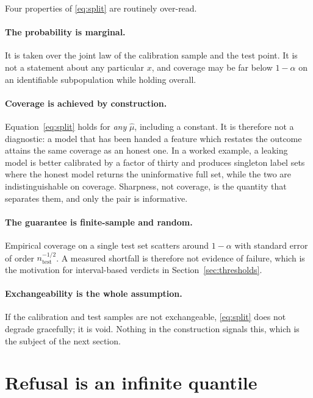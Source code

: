\documentclass[11pt,a4paper]{article}
\theoremstyle{definition}
\begin{document}
Four properties of \eqref{eq:split} are routinely over-read.

\paragraph{The probability is marginal.} It is taken over the joint law of the
calibration sample and the test point. It is not a statement about any
particular $x$, and coverage may be far below $1-\alpha$ on an identifiable
subpopulation while holding overall.

\paragraph{Coverage is achieved by construction.} Equation~\eqref{eq:split}
holds for \emph{any} $\hat\mu$, including a constant. It is therefore not a
diagnostic: a model that has been handed a feature which restates the outcome
attains the same coverage as an honest one. In a worked example, a leaking
model is better calibrated by a factor of thirty and produces singleton label
sets where the honest model returns the uninformative full set, while the two
are indistinguishable on coverage. Sharpness, not coverage, is the quantity
that separates them, and only the pair is informative.

\paragraph{The guarantee is finite-sample and random.} Empirical coverage on a
single test set scatters around $1-\alpha$ with standard error of order
$n_{\text{test}}^{-1/2}$. A measured shortfall is therefore not evidence of
failure, which is the motivation for interval-based verdicts in Section~\ref{sec:thresholds}.

\paragraph{Exchangeability is the whole assumption.} If the calibration and
test samples are not exchangeable, \eqref{eq:split} does not degrade
gracefully; it is void. Nothing in the construction signals this, which is the
subject of the next section.

\section{Refusal is an infinite quantile}
\label{sec:refusal-sec}
\end{document}

